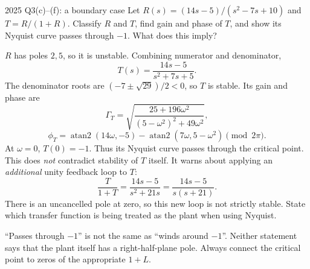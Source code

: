 \begin{question}{2025 Q3(c)--(f): a boundary case}
Let $R(s)=(14s-5)/(s^2-7s+10)$ and $T=R/(1+R)$. Classify $R$ and $T$, find gain and phase of $T$, and show its Nyquist curve passes through $-1$. What does this imply?
\end{question}
\begin{answer}
$R$ has poles $2,5$, so it is unstable. Combining numerator and denominator,
\[T(s)=\frac{14s-5}{s^2+7s+5}.\]
The denominator roots are $(-7\pm\sqrt{29})/2<0$, so $T$ is stable. Its gain and phase are
\[\Gamma_T=\sqrt{\frac{25+196\omega^2}{(5-\omega^2)^2+49\omega^2}},\]
\[\phi_T=\operatorname{atan2}(14\omega,-5)-\operatorname{atan2}(7\omega,5-\omega^2)\pmod{2\pi}.\]
At $\omega=0$, $T(0)=-1$. Thus its Nyquist curve passes through the critical point. This does \emph{not} contradict stability of $T$ itself. It warns about applying an \emph{additional} unity feedback loop to $T$:
\[\frac T{1+T}=\frac{14s-5}{s^2+21s}=\frac{14s-5}{s(s+21)}.\]
There is an uncancelled pole at zero, so this new loop is not strictly stable. State which transfer function is being treated as the plant when using Nyquist.
\end{answer}
\begin{tip}
``Passes through $-1$'' is not the same as ``winds around $-1$''. Neither statement says that the plant itself has a right-half-plane pole. Always connect the critical point to zeros of the appropriate $1+L$.
\end{tip}


